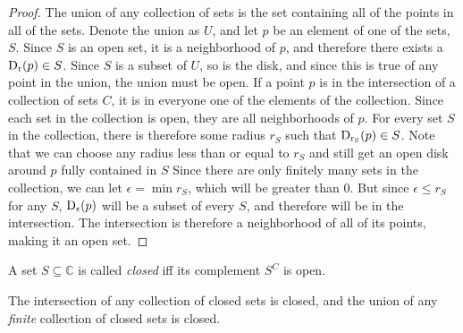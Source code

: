 \documentclass{refbook}
\begin{document}
\begin{proof}
The union of any collection of sets is the set containing all of the points in all of the sets. Denote the union as $U$, and let $p$ be an element of one of the sets, $S$. Since $S$ is an open set, it is a neighborhood of $p$, and therefore there exists a $\disk{p}{r} \in S$.
Since $S$ is a subset of $U$, so is the disk, and since this is true of any point in the union, the union must be open.
If a point $p$ is in the intersection of a collection of sets $C$, it is in everyone one of the elements of the collection. Since each set in the collection is open, they are all neighborhoods of $p$. For every set $S$ in the collection, there is therefore some radius $r_S$ such that $\disk{p}{r_S} \in S$. Note that we can choose any radius less than or equal to $r_S$ and still get an open disk around $p$ fully contained in $S$
Since there are only finitely many sets in the collection, we can let $\epsilon = \min r_S$, which will be greater than $0$. But since $\epsilon \leq r_S$ for any $S$, $\disk{p}{\epsilon}$ will be a subset of every $S$, and therefore will be in the intersection. The intersection is therefore a neighborhood of all of its points, making it an open set. 
\end{proof}
\begin{definition}
A set $S \subseteq \mathbb{C}$ is called \emph{closed} iff its complement $S^C$ is open.
\end{definition}
\begin{lemma}
The intersection of any collection of closed sets is closed, and the union of any \emph{finite} collection of closed sets is closed.
\end{lemma}
\end{document}
